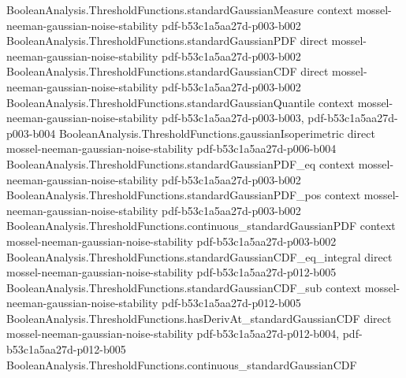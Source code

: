 \begin{lemma}
\label{BooleanAnalysis.GaussianSpace.hasDerivAt_gaussianBivariateStability_right}
\leanok
{}
\proofstep
  {BooleanAnalysis.ThresholdFunctions.standardGaussianMeasure}
  {context}
  {mossel-neeman-gaussian-noise-stability}
  {pdf-b53c1a5aa27d-p003-b002}
\proofstep
  {BooleanAnalysis.ThresholdFunctions.standardGaussianPDF}
  {direct}
  {mossel-neeman-gaussian-noise-stability}
  {pdf-b53c1a5aa27d-p003-b002}
\proofstep
  {BooleanAnalysis.ThresholdFunctions.standardGaussianCDF}
  {direct}
  {mossel-neeman-gaussian-noise-stability}
  {pdf-b53c1a5aa27d-p003-b002}
\proofstep
  {BooleanAnalysis.ThresholdFunctions.standardGaussianQuantile}
  {context}
  {mossel-neeman-gaussian-noise-stability}
  {pdf-b53c1a5aa27d-p003-b003,
    pdf-b53c1a5aa27d-p003-b004}
\proofstep
  {BooleanAnalysis.ThresholdFunctions.gaussianIsoperimetric}
  {direct}
  {mossel-neeman-gaussian-noise-stability}
  {pdf-b53c1a5aa27d-p006-b004}
\proofstep
  {BooleanAnalysis.ThresholdFunctions.standardGaussianPDF_eq}
  {context}
  {mossel-neeman-gaussian-noise-stability}
  {pdf-b53c1a5aa27d-p003-b002}
\proofstep
  {BooleanAnalysis.ThresholdFunctions.standardGaussianPDF_pos}
  {context}
  {mossel-neeman-gaussian-noise-stability}
  {pdf-b53c1a5aa27d-p003-b002}
\proofstep
  {BooleanAnalysis.ThresholdFunctions.continuous_standardGaussianPDF}
  {context}
  {mossel-neeman-gaussian-noise-stability}
  {pdf-b53c1a5aa27d-p003-b002}
\proofstep
  {BooleanAnalysis.ThresholdFunctions.standardGaussianCDF_eq_integral}
  {direct}
  {mossel-neeman-gaussian-noise-stability}
  {pdf-b53c1a5aa27d-p012-b005}
\proofstep
  {BooleanAnalysis.ThresholdFunctions.standardGaussianCDF_sub}
  {context}
  {mossel-neeman-gaussian-noise-stability}
  {pdf-b53c1a5aa27d-p012-b005}
\proofstep
  {BooleanAnalysis.ThresholdFunctions.hasDerivAt_standardGaussianCDF}
  {direct}
  {mossel-neeman-gaussian-noise-stability}
  {pdf-b53c1a5aa27d-p012-b004,
    pdf-b53c1a5aa27d-p012-b005}
\proofstep
  {BooleanAnalysis.ThresholdFunctions.continuous_standardGaussianCDF}

\end{lemma}

